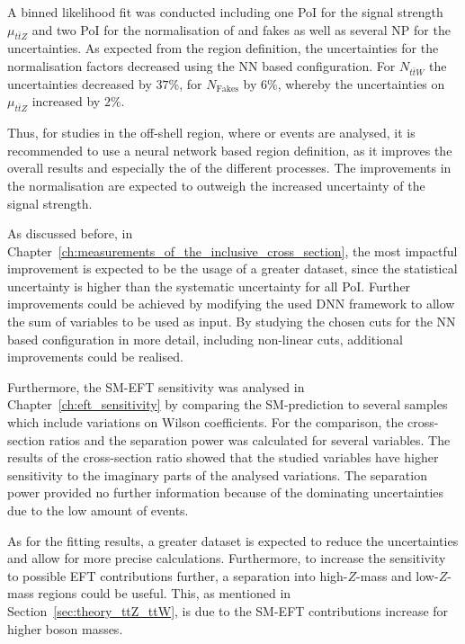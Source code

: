 \documentclass[bachelor,oneside, BCOR10mm,
			ngerman,english  %
]{GAUBM}
\begin{document}
A binned likelihood fit was conducted including one PoI for the signal strength $\mu_{t\bar{t}Z}$ and two PoI for the normalisation of \ttbarW and fakes as well as several NP for the uncertainties. As expected from the region definition, the uncertainties for the normalisation factors decreased using the NN based configuration. For $N_{t\bar{t}W}$ the uncertainties decreased by $37\%$, for $N_\text{Fakes}$ by $6\%$, whereby the uncertainties on $\mu_{t\bar{t}Z}$ increased by $2\%$. 

Thus, for studies in the off-shell region, where \ttbarZ or \ttbarW events are analysed, it is recommended to use a neural network based region definition, as it improves the overall results and especially the of the different processes. The improvements in the normalisation are expected to outweigh the increased uncertainty of the signal strength. 

As discussed before, in Chapter~\ref{ch:measurements_of_the_inclusive_cross_section}, the most impactful improvement is expected to be the usage of a greater dataset, since the statistical uncertainty is higher than the systematic uncertainty for all PoI. Further improvements could be achieved by modifying the used DNN framework to allow the sum of variables to be used as input. By studying the chosen cuts for the NN based configuration in more detail, including non-linear cuts, additional improvements could be realised.

Furthermore, the SM-EFT sensitivity was analysed in Chapter~\ref{ch:eft_sensitivity} by comparing the SM-prediction to several samples which include variations on Wilson coefficients. For the comparison, the cross-section ratios and the separation power was calculated for several variables. The results of the cross-section ratio showed that the studied variables have higher sensitivity to the imaginary parts of the analysed variations. The separation power provided no further information because of the dominating uncertainties due to the low amount of events.

As for the fitting results, a greater dataset is expected to reduce the uncertainties and allow for more precise calculations. Furthermore, to increase the sensitivity to possible EFT contributions further, a separation into high-$Z$-mass and low-$Z$-mass regions could be useful. This, as mentioned in Section~\ref{sec:theory_ttZ_ttW}, is due to the SM-EFT contributions increase for higher boson masses.
\clearpage
\end{document}
